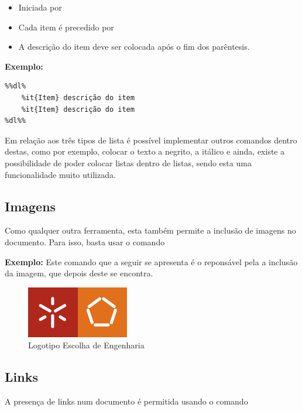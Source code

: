 \documentclass[11pt,a4paper]{article}
\begin{document}
\begin{itemize}
    \item Iniciada por \verb@ %%dl% @ e finalizada por \verb@ %dl%% @;
    \item Cada item é precedido por \verb@ %it{} @ e o texto que ficará a negrito deverá ser colocado entre os parêntesis;
    \item A descrição do item deve ser colocada após o fim dos parêntesis.
\end{itemize}



\textbf{Exemplo:}

\begin{verbatim}
%%dl%
    %it{Item} descrição do item
    %it{Item} descrição do item
%dl%%
\end{verbatim} 

Em relação aos três tipos de lista é possível implementar outros comandos dentro destas, como por exemplo, colocar o texto a negrito, a itálico e ainda, existe a possibilidade de poder colocar listas dentro de listas, sendo esta uma funcionalidade muito utilizada. \\ 
 

\subsection{Imagens}
Como qualquer outra ferramenta, esta também permite a inclusão de imagens no documento. Para isso, basta usar o comando \verb@ %img{path,caption} @, sendo "path" o caminho para a respectiva imagem e "caption" a legenda da mesma. \\  

\textbf{Exemplo:}
Este comando que a seguir se apresenta é o reponsável pela a inclusão da imagem, que depois deste se encontra. \\  

\verb@ %img{exemplo.png, Logotipo Escolha de Engenharia} @


\begin{figure}[h]
\centering
\includegraphics{escola_eng.png}
\caption{ Logotipo Escolha de Engenharia}
\end{figure}


\subsection{Links}
A presença de links num documento é permitida usando o comando \verb@ %link{url,texto} @. No campo "texto" é inserido o texto que fica associado ao link colocado no campo "url", como mostra o exemplo. \\  
\end{document}
